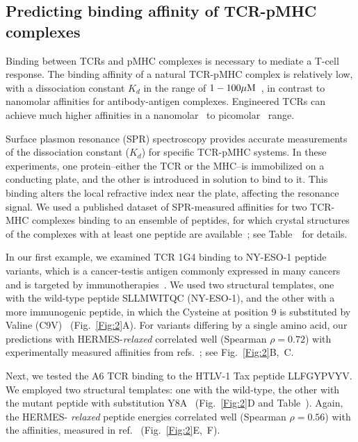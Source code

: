 \subsection{Predicting binding affinity of TCR-pMHC complexes} 
 Binding between TCRs and pMHC complexes is necessary to mediate a T-cell response. The binding
 affinity of a natural TCR-pMHC complex is relatively low, with a dissociation constant $K_d$ in the
 range of $1-100\mu{\rm M}$~\cite{Davis1998-bv,Piepenbrink2009-jy,Zhong2013-ja}, in contrast to
 nanomolar affinities for antibody-antigen complexes. Engineered TCRs can achieve much higher
 affinities in a nanomolar~\cite{Soto2013-df} to picomolar~\cite{Li2005-md, Dunn2006-dh} range.

Surface plasmon resonance (SPR) spectroscopy provides accurate measurements of the dissociation
constant ($K_d$) for specific TCR-pMHC systems. In these experiments, one protein--either the TCR or
the MHC--is immobilized on a conducting plate, and the other is introduced in solution to bind to
it. This binding alters the local refractive index near the plate, affecting the resonance signal.
We {used a published} dataset of SPR-measured affinities for two TCR-MHC complexes binding to an
ensemble of peptides, for which crystal structures of the complexes with at least one peptide are
available~\cite{Aleksic2010-wz,Pettmann2021-kl}; see Table~\AffActInfoTable~for details.

In our first example, we examined TCR 1G4 binding to NY-ESO-1 peptide variants, which is a
cancer-testis antigen commonly expressed in many cancers and is targeted by
immunotherapies~\cite{Esfandiary2015-jf}. We used two structural templates, one with the wild-type
peptide SLLMWITQC (NY-ESO-1), and the other with a more immunogenic peptide, in which the Cysteine
at position 9 is substituted by Valine (C9V)~\cite{Chen2000-vq,Chen2005-jk} (Fig.~\ref{Fig:2}A). For
variants differing by a single amino acid, our predictions with HERMES-{\em relaxed} correlated well
(Spearman {$\rho=0.72$}) with experimentally measured affinities from
refs.~\cite{Aleksic2010-wz,Pettmann2021-kl}; see Fig.~\ref{Fig:2}B,~C.

Next, we tested the A6 TCR binding to the HTLV-1 Tax peptide LLFGYPVYV. We employed two structural
templates: one with the wild-type, the other with the mutant peptide with substitution
Y8A~\cite{Garboczi1996-fr} (Fig.~\ref{Fig:2}D and {Table~\AffActInfoTable}). Again, the HERMES-{\em
relaxed} peptide energies correlated well (Spearman {$\rho=0.56$}) with the affinities, measured in
ref.~\cite{Pettmann2021-kl} (Fig.~\ref{Fig:2}E,~F).

